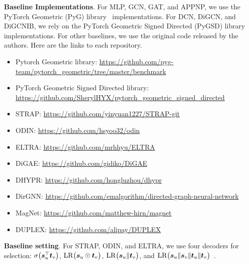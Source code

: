 \textbf{Baseline Implementations}. For MLP, GCN, GAT, and APPNP, we use the PyTorch Geometric (PyG) library~\cite{pyg} implementations. For DCN, DiGCN, and DiGCNIB, we rely on the PyTorch Geometric Signed Directed (PyGSD) library~\cite{dpyg} implementations. For other baselines, we use the original code released by the authors. Here are the links to each repository.
\begin{itemize}[topsep=0pt, partopsep=0pt]
    \item Pytorch Geometric library:
    \href{https://github.com/pyg-team/pytorch_geometric/tree/master/benchmark}{https://github.com/pyg-team/pytorch\_geometric/tree/master/benchmark}
    \item PyTorch Geometric Signed Directed library: \href{https://github.com/SherylHYX/pytorch_geometric_signed_directed}{https://github.com/SherylHYX/pytorch\_geometric\_signed\_directed}
    \item STRAP: \href{https://github.com/yinyuan1227/STRAP-git}{https://github.com/yinyuan1227/STRAP-git}
    \item ODIN: \href{https://github.com/hsyoo32/odin}{https://github.com/hsyoo32/odin} 
    \item ELTRA: \href{https://github.com/mrhhyu/ELTRA}{https://github.com/mrhhyu/ELTRA} 
    \item DiGAE:
    \href{https://github.com/gidiko/DiGAE}{https://github.com/gidiko/DiGAE}
    \item DHYPR:
    \href{https://github.com/hongluzhou/dhypr}{https://github.com/hongluzhou/dhypr}
    \item DirGNN:
    \href{https://github.com/emalgorithm/directed-graph-neural-network}{https://github.com/emalgorithm/directed-graph-neural-network}
    \item MagNet:
    \href{https://github.com/matthew-hirn/magnet}{https://github.com/matthew-hirn/magnet}
    \item DUPLEX:
    \href{https://github.com/alipay/DUPLEX}{https://github.com/alipay/DUPLEX}
\end{itemize}
\textbf{Baseline setting}. For STRAP, ODIN, and ELTRA, we use four decoders for selection:  
\(\sigma\bigl({\bm{s}}_u^{\top}{\bm{t}}_v\bigr)\), \(\mathrm{LR}\bigl({\bm{s}}_u \odot {\bm{t}}_v\bigr)\), \(\mathrm{LR}\bigl({\bm{s}}_u \|{\bm{t}}_v\bigr)\), and \(\mathrm{LR}\bigl({\bm{s}}_u \| {\bm{s}}_v \| {\bm{t}}_u \| {\bm{t}}_v\bigr)\)~\cite{odin}.  
